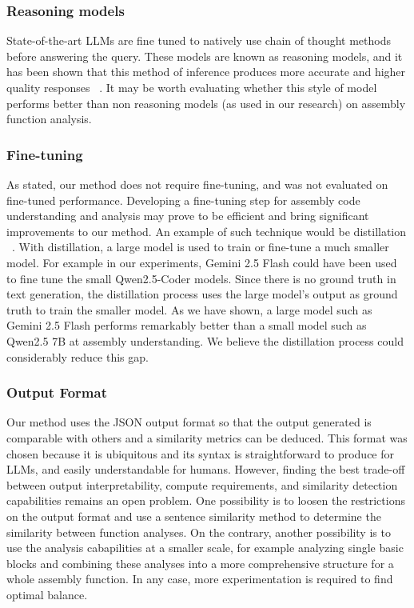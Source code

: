 \subsubsection{Reasoning models}

State-of-the-art LLMs are fine tuned to natively use chain of thought methods ~\cite{c-o-t} before answering the query.
These models are known as reasoning models, and it has been shown that this method of inference produces more accurate and
higher quality responses ~\cite{c-o-t,reasoning,thinking-llm}. It may be worth evaluating whether this style of model performs better than
non reasoning models (as used in our research) on assembly function analysis.

\subsubsection{Fine-tuning}

As stated, our method does not require fine-tuning, and was not evaluated on fine-tuned performance. Developing a fine-tuning step
for assembly code understanding and analysis may prove to be efficient and bring significant improvements to our method.
An example of such technique would be distillation ~\cite{distillation}. With distillation, a large model is used to train or fine-tune a
much smaller model. For example in our experiments, Gemini 2.5 Flash could have been used to fine tune the small Qwen2.5-Coder models.
Since there is no ground truth in text generation, the distillation process uses the large model's output as ground truth
to train the smaller model. As we have shown, a large model such as Gemini 2.5 Flash performs remarkably better than a
small model such as Qwen2.5 7B at assembly understanding. We believe the distillation process could considerably reduce this gap.

\subsubsection{Output Format}

Our method uses the JSON output format so that the output generated is comparable with others and a similarity metrics can be deduced.
This format was chosen because it is ubiquitous and its syntax is straightforward to produce for LLMs, and easily understandable for humans.
However, finding the best trade-off between output interpretability, compute requirements, and similarity detection capabilities remains
an open problem. One possibility is to loosen the restrictions on the output format and use a sentence similarity method to determine
the similarity between function analyses. On the contrary, another possibility is to use the analysis cabapilities at a smaller scale,
for example analyzing single basic blocks and combining these analyses into a more comprehensive structure for a whole assembly function.
In any case, more experimentation is required to find optimal balance.

